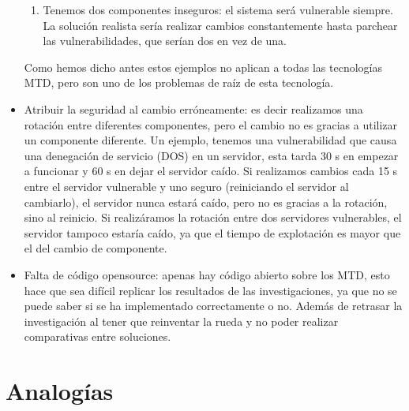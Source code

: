 \begin{itemize}
\begin{enumerate}
        \item Tenemos dos componentes inseguros: el sistema será vulnerable siempre. La solución realista sería realizar cambios constantemente hasta parchear las vulnerabilidades, que serían dos en vez de una.
    \end{enumerate}
    Como hemos dicho antes estos ejemplos no aplican a todas las tecnologías MTD, pero son uno de los problemas de raíz de esta tecnología.
    \item Atribuir la seguridad al cambio erróneamente: es decir realizamos una rotación entre diferentes componentes, pero el cambio no es gracias a utilizar un componente diferente. Un ejemplo, tenemos una vulnerabilidad que causa una denegación de servicio (DOS) en un servidor, esta tarda 30 s en empezar a funcionar y 60 s en dejar el servidor caído. Si realizamos cambios cada 15 s entre el servidor vulnerable y uno seguro (reiniciando el servidor al cambiarlo), el servidor nunca estará caído, pero no es gracias a la rotación, sino al reinicio. Si realizáramos la rotación entre dos servidores vulnerables, el servidor tampoco estaría caído, ya que el tiempo de explotación es mayor que el del cambio de componente.
    \item Falta de código opensource: apenas hay código abierto sobre los MTD, esto hace que sea difícil replicar los resultados de las investigaciones, ya que no se puede saber si se ha implementado correctamente o no. Además de retrasar la investigación al tener que reinventar la rueda y no poder realizar comparativas entre soluciones.
\end{itemize}

\section{Analogías}

